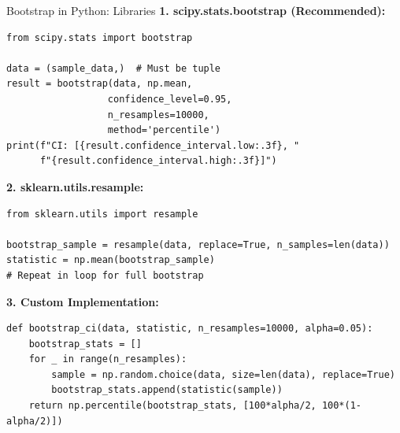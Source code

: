 \documentclass[aspectratio=169]{beamer}
\begin{document}
\begin{frame}[fragile]{Bootstrap in Python: Libraries}
\scriptsize
\textbf{1. scipy.stats.bootstrap (Recommended):}
\begin{lstlisting}[basicstyle=\tiny]
from scipy.stats import bootstrap

data = (sample_data,)  # Must be tuple
result = bootstrap(data, np.mean, 
                  confidence_level=0.95,
                  n_resamples=10000,
                  method='percentile')
print(f"CI: [{result.confidence_interval.low:.3f}, "
      f"{result.confidence_interval.high:.3f}]")
\end{lstlisting}

\vspace{0.05cm}
\textbf{2. sklearn.utils.resample:}
\begin{lstlisting}[basicstyle=\tiny]
from sklearn.utils import resample

bootstrap_sample = resample(data, replace=True, n_samples=len(data))
statistic = np.mean(bootstrap_sample)
# Repeat in loop for full bootstrap
\end{lstlisting}

\vspace{0.05cm}
\textbf{3. Custom Implementation:}
\begin{lstlisting}[basicstyle=\tiny]
def bootstrap_ci(data, statistic, n_resamples=10000, alpha=0.05):
    bootstrap_stats = []
    for _ in range(n_resamples):
        sample = np.random.choice(data, size=len(data), replace=True)
        bootstrap_stats.append(statistic(sample))
    return np.percentile(bootstrap_stats, [100*alpha/2, 100*(1-alpha/2)])
\end{lstlisting}
\end{frame}
\end{document}
